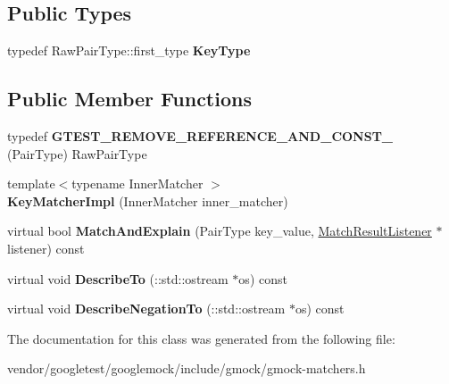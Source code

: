 \subsection*{Public Types}
\begin{DoxyCompactItemize}
\item 
\mbox{\label{classtesting_1_1internal_1_1_key_matcher_impl_a9bd63b699518bd9868ba24766547667a}} 
typedef Raw\+Pair\+Type\+::first\+\_\+type {\bfseries Key\+Type}
\end{DoxyCompactItemize}
\subsection*{Public Member Functions}
\begin{DoxyCompactItemize}
\item 
\mbox{\label{classtesting_1_1internal_1_1_key_matcher_impl_a006551fc32e5aef0d319a304ddc5f383}} 
typedef {\bfseries G\+T\+E\+S\+T\+\_\+\+R\+E\+M\+O\+V\+E\+\_\+\+R\+E\+F\+E\+R\+E\+N\+C\+E\+\_\+\+A\+N\+D\+\_\+\+C\+O\+N\+S\+T\+\_\+} (Pair\+Type) Raw\+Pair\+Type
\item 
\mbox{\label{classtesting_1_1internal_1_1_key_matcher_impl_a9ad2a218b0366cae9fb09e82347bd8e7}} 
{\footnotesize template$<$typename Inner\+Matcher $>$ }\\{\bfseries Key\+Matcher\+Impl} (Inner\+Matcher inner\+\_\+matcher)
\item 
\mbox{\label{classtesting_1_1internal_1_1_key_matcher_impl_ae821c96473c6400defbb21eb9eca8d4c}} 
virtual bool {\bfseries Match\+And\+Explain} (Pair\+Type key\+\_\+value, \mbox{\hyperlink{classtesting_1_1_match_result_listener}{Match\+Result\+Listener}} $\ast$listener) const
\item 
\mbox{\label{classtesting_1_1internal_1_1_key_matcher_impl_af024a1774c1aedae7b1dc532df7e27af}} 
virtual void {\bfseries Describe\+To} (\+::std\+::ostream $\ast$os) const
\item 
\mbox{\label{classtesting_1_1internal_1_1_key_matcher_impl_a4be87d136547063a16777151b691046d}} 
virtual void {\bfseries Describe\+Negation\+To} (\+::std\+::ostream $\ast$os) const
\end{DoxyCompactItemize}


The documentation for this class was generated from the following file\+:\begin{DoxyCompactItemize}
\item 
vendor/googletest/googlemock/include/gmock/gmock-\/matchers.\+h\end{DoxyCompactItemize}
